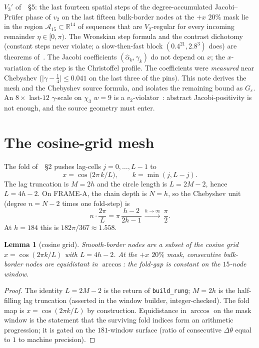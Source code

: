 \documentclass[11pt]{article}
\newtheorem{lemma}{Lemma}
\theoremstyle{remark}
\newcommand{\R}{\mathbb{R}}
\begin{document}
$V_3'$ of~\cite{v2lem}~\S5: the last fourteen spatial steps of
the degree-accumulated Jacobi--Pr\"ufer phase of $v_2$ on the
last fifteen bulk-border nodes at the $+x$ $20\%$ mask lie in
the region $\mathcal{A}_{15}\subset\R^{14}$ of sequences that
are $V_2$-regular for every incoming remainder
$\eta\in[0,\pi)$.  The Wronskian step formula and the contrast
dichotomy (constant steps never violate; a slow-then-fast
block $(0.4^{21},2.8^{3})$ does) are theorems of~\cite{v2lem}.
The Jacobi coefficients $(\hat\alpha_k,\gamma_k)$ do not depend
on $x$; the $x$-variation of the step is the Christoffel profile.
The coefficients were \emph{measured} near Chebyshev
($\lvert\gamma-\tfrac14\rvert\le 0.041$ on the last three of the
pins).  This note derives the mesh and the Chebyshev source
formula, and isolates the remaining bound as $G_\varepsilon$.
An $8\times$ last-$12$ $\gamma$-scale on $\chi_3$ $w=9$ is a
$v_2$-violator~\cite{v2lem}: abstract Jacobi-positivity is not
enough, and the source geometry must enter.

\section{The cosine-grid mesh}\label{sec:mesh}

The fold of~\cite{xn}~\S2 pushes lag-cells $j=0,\ldots,L-1$ to
\[
x=\cos\bigl(2\pi\, k/L\bigr),\qquad
k=\min(j,L-j).
\]
The lag truncation is $M=2h$ and the circle length is
$L=2M-2$, hence $L=4h-2$.  On FRAME-A, the chain depth is
$N=h$, so the Chebyshev unit (degree $n=N-2$ times one
fold-step) is
\begin{equation}\label{eq:unit}
n\cdot\frac{2\pi}{L}
=\pi\,\frac{h-2}{2h-1}\,\xrightarrow{h\to\infty}\,\frac\pi2.
\end{equation}
At $h=184$ this is $182\pi/367\approx 1.558$.

\begin{lemma}[cosine grid]\label{lem:mesh}
Smooth-border nodes are a subset of the cosine grid
$x=\cos(2\pi k/L)$ with $L=4h-2$.  At the $+x$ $20\%$ mask,
consecutive bulk-border nodes are equidistant in $\arccos$:
the fold-gap is constant on the $15$-node window.
\end{lemma}

\begin{proof}
The identity $L=2M-2$ is the return of
\texttt{build\_rung}; $M=2h$ is the half-filling lag truncation
(asserted in the window builder, integer-checked).  The fold
map is $x=\cos(2\pi k/L)$ by construction.  Equidistance in
$\arccos$ on the mask window is the statement that the surviving
fold indices form an arithmetic progression; it is gated on the
$181$-window surface (ratio of consecutive $\Delta\theta$ equal
to $1$ to machine precision).
\end{proof}
\end{document}
